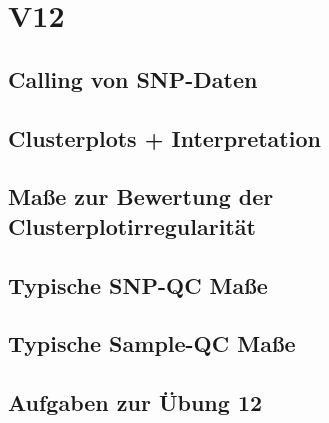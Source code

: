 \section{V12}
\subsection{Calling von SNP-Daten}

\subsection{Clusterplots + Interpretation}

\subsection{Maße zur Bewertung der Clusterplotirregularität}

\subsection{Typische SNP-QC Maße}

\subsection{Typische Sample-QC Maße}

\subsection{Aufgaben zur Übung 12}